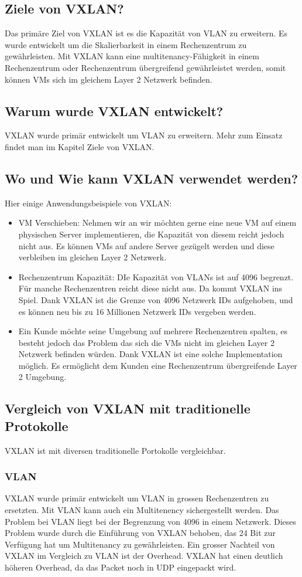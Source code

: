 \documentclass[a4,12pt]{scrartcl}
\begin{document}
\subsection{Ziele von VXLAN?}
Das primäre Ziel von VXLAN ist es die Kapazität von VLAN zu erweitern. Es wurde entwickelt um die Skalierbarkeit in einem Rechenzentrum zu gewährleisten. Mit VXLAN kann eine multitenancy-Fähigkeit in einem Rechenzentrum oder Rechenzentrum übergreifend gewährleistet werden, somit können VMs sich im gleichem Layer 2 Netzwerk befinden. 

\subsection{Warum wurde VXLAN entwickelt?}
VXLAN wurde primär entwickelt um VLAN zu erweitern. Mehr zum Einsatz findet man im Kapitel Ziele von VXLAN. 

\subsection{Wo und Wie kann VXLAN verwendet werden?}
Hier einige Anwendungsbeispiele von VXLAN: 
\begin{itemize}
\item VM Verschieben: Nehmen wir an wir möchten gerne eine neue VM auf einem physischen Server implementieren, die Kapazität von diesem reicht jedoch nicht aus. Es können VMs auf andere Server gezügelt werden und diese verbleiben im gleichen Layer 2 Netzwerk. 
\item Rechenzentrum Kapazität: DIe Kapazität von VLANs ist auf 4096 begrenzt. Für manche Rechenzentren reicht diese nicht aus. Da kommt VXLAN ins Spiel. Dank VXLAN ist die Grenze von 4096 Netzwerk IDs aufgehoben, und es können neu bis zu 16 Millionen Netzwerk IDs vergeben werden. 
\item Ein Kunde möchte seine Umgebung auf mehrere Rechenzentren spalten, es besteht jedoch das Problem das sich die VMs nicht im gleichen Layer 2 Netzwerk befinden würden. Dank VXLAN ist eine solche Implementation möglich. Es ermöglicht dem Kunden eine Rechenzentrum übergreifende Layer 2 Umgebung. 
\end{itemize}

\subsection{Vergleich von VXLAN mit traditionelle Protokolle}
VXLAN ist mit diversen traditionelle Portokolle vergleichbar. 
\subsubsection{VLAN}
VXLAN wurde primär entwickelt um VLAN in grossen Rechenzentren zu ersetzten. Mit VLAN kann auch ein Multitenency sichergestellt werden. Das Problem bei VLAN liegt bei der Begrenzung von 4096 in einem Netzwerk. Dieses Problem wurde durch die Einführung von VXLAN behoben, das 24 Bit zur Verfügung hat um Multitenancy zu gewährleisten. Ein grosser Nachteil von VXLAN im Vergleich zu VLAN ist der Overhead. VXLAN hat einen deutlich höheren Overhead, da das Packet noch in UDP eingepackt wird. 
\end{document}
